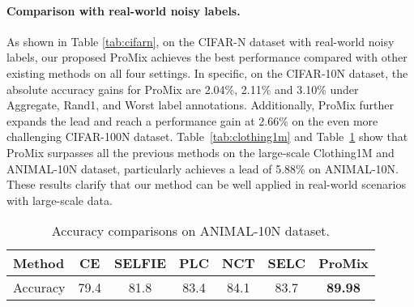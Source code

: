 \documentclass{article}
\begin{document}
\paragraph{Comparison with real-world noisy labels.}
As shown in Table \ref{tab:cifarn}, on the CIFAR-N dataset with real-world noisy labels, our proposed ProMix achieves the best performance compared with other existing methods on all four settings. In specific, on the CIFAR-10N dataset, the absolute accuracy gains for ProMix are 2.04\%, 2.11\% and 3.10\%  under Aggregate, Rand1, and Worst label annotations. Additionally, ProMix further expands the lead and reach a performance gain at 2.66\% on the even more challenging CIFAR-100N dataset. Table~\ref{tab:clothing1m} and Table~\ref{tab:animal} show that ProMix surpasses all the previous methods on the large-scale Clothing1M and ANIMAL-10N dataset, particularly achieves a lead of 5.88\% on ANIMAL-10N. These results clarify that our method can be well applied in real-world scenarios with large-scale data.


\begin{table}[t]
\centering
\small
\tabcolsep=0.18cm
\begin{tabular}{l|ccccc|c}
\toprule
Method& CE  & SELFIE  & PLC  & NCT  & SELC & \textbf{ProMix}      \\ \midrule
Accuracy & 79.4 & 81.8      & 83.4     & 84.1 & 83.7 & \textbf{89.98} \\ \bottomrule
\end{tabular}
\caption{Accuracy comparisons on ANIMAL-10N dataset. }
\label{tab:animal}
\end{table}
\end{document}
